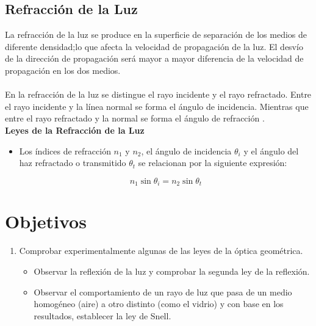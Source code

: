 \documentclass[
aps,
reprint,
amsmath, amssymb,
superscriptaddress,
]{revtex4-2}
\begin{document}
\subsection{Refracción de la Luz}

La refracción de la luz se produce en la superficie de separación de los medios de diferente densidad;lo que afecta la velocidad de propagación de la luz. El desvío de la dirección de propagación será mayor a mayor diferencia de la velocidad de propagación en los dos medios.\\
\\
En la refracción de la luz se distingue el rayo incidente y el rayo refractado. Entre el rayo incidente y la línea normal se forma el ángulo de incidencia. Mientras que entre el rayo refractado y la normal se forma el ángulo de refracción \cite{optics}.\\


\textbf{Leyes de la Refracción de la Luz}

\begin{itemize}
    \item Los índices de refracción $n_1$ y $n_2$, el ángulo de incidencia $\theta_{i}$ y el ángulo del haz refractado o transmitido $\theta_{t}$ se relacionan por la siguiente expresión:
    
    \begin{equation}
        \label{eqn:ley_snell}
        n_{1} \sin{\theta_{i}} = n_{2} \sin{\theta_{t}} 
    \end{equation}
\end{itemize}

\section{Objetivos}
\begin{enumerate}
    \item Comprobar experimentalmente algunas de las leyes de la óptica geométrica.
    \begin{itemize}
        \item Observar la reflexión de la luz y comprobar la segunda ley de la reflexión.
        \item Observar el comportamiento de un rayo de luz que pasa de un medio homogéneo (aire) a otro distinto (como el vidrio) y con base en los resultados, establecer la ley de Snell.
    \end{itemize}
\end{enumerate}
\end{document}
